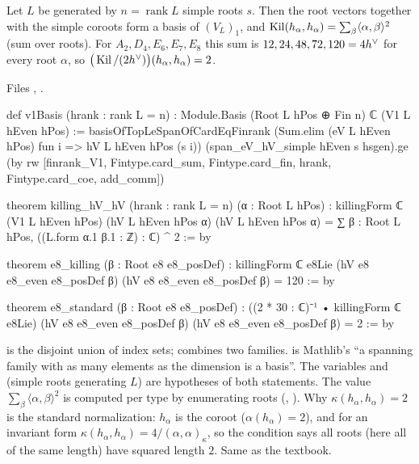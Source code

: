 \begin{theorem}\label{l23:thm:normalization}
Let $L$ be generated by $n=\operatorname{rank}L$ simple roots $s$. Then the root vectors together with the simple coroots form a basis of
$(V_L)_1$, and $\operatorname{Kil}(h_\alpha,h_\alpha)=\sum_{\beta}\langle\alpha,\beta\rangle^2$ (sum over roots). For $A_2,D_4,E_6,E_7,E_8$ this sum is
$12,24,48,72,120=4h^\vee$ for every root $\alpha$, so $\big(\operatorname{Kil}/(2h^\vee)\big)(h_\alpha,h_\alpha)=2$.
\end{theorem}
\noindent Files ,
.
\begin{leancode}
def v1Basis (hrank : rank L = n) : Module.Basis (Root L hPos ⊕ Fin n) ℂ (V1 L hEven hPos) :=
  basisOfTopLeSpanOfCardEqFinrank (Sum.elim (eV L hEven hPos) fun i => hV L hEven hPos (s i))
    (span_eV_hV_simple hEven s hsgen).ge
    (by rw [finrank_V1, Fintype.card_sum, Fintype.card_fin, hrank, Fintype.card_coe, add_comm])

theorem killing_hV_hV (hrank : rank L = n) (α : Root L hPos) :
    killingForm ℂ (V1 L hEven hPos) (hV L hEven hPos α) (hV L hEven hPos α)
      = ∑ β : Root L hPos, ((L.form α.1 β.1 : ℤ) : ℂ) ^ 2 := by

theorem e8_killing (β : Root e8 e8_posDef) :
    killingForm ℂ e8Lie (hV e8 e8_even e8_posDef β) (hV e8 e8_even e8_posDef β) = 120 := by

theorem e8_standard (β : Root e8 e8_posDef) :
    ((2 * 30 : ℂ)⁻¹ • killingForm ℂ e8Lie) (hV e8 e8_even e8_posDef β)
      (hV e8 e8_even e8_posDef β) = 2 := by
\end{leancode}

\begin{dictionary}
 is the disjoint union of index sets;  combines two families.  is Mathlib's
``a spanning family with as many elements as the dimension is a basis''. The variables  and  (simple roots generating
$L$) are hypotheses of both statements. The value $\sum_\beta\langle\alpha,\beta\rangle^2$ is computed per type by enumerating roots
(, ). Why $\kappa(h_\alpha,h_\alpha)=2$ is the standard normalization: $h_\alpha$ is the coroot
($\alpha(h_\alpha)=2$), and for an invariant form $\kappa(h_\alpha,h_\alpha)=4/(\alpha,\alpha)_\kappa$, so the condition says all roots
(here all of the same length) have squared length $2$. Same as the textbook.
\end{dictionary}

